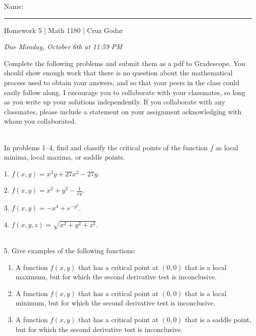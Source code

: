 \documentclass{article}
\begin{document}
\Large Name: \rule{2in}{0.15mm} \hfill Homework 5 | Math 1180 | Cruz Godar \vspace{4pt} \normalsize

\textit{Due Monday, October 6th at 11:59 PM}

Complete the following problems and submit them as a pdf to Gradescope. You should show enough work that there is no question about the mathematical process used to obtain your answers, and so that your peers in the class could easily follow along. I encourage you to collaborate with your classmates, so long as you write up your solutions independently. If you collaborate with any classmates, please include a statement on your assignment acknowledging with whom you collaborated.

~\\

In problems 1--4, find and classify the critical points of the function $f$ as local minima, local maxima, or saddle points.

1. $f(x, y) = x^3y + 27x^2 - 27y$.

2. $f(x, y) = x^2 + y^2 - \frac{1}{xy}$.

3. $f(x, y) = -x^4 + e^{-y^{2}}$.

4. $f(x, y, z) = \sqrt{x^2 + y^2 + z^2}$.

~\\

5. Give examples of the following functions:

\begin{enumerate}

	\item A function $f(x, y)$ that has a critical point at $(0, 0)$ that is a local maximum, but for which the second derivative test is inconclusive.

	\item A function $f(x, y)$ that has a critical point at $(0, 0)$ that is a local minimum, but for which the second derivative test is inconclusive.

	\item A function $f(x, y)$ that has a critical point at $(0, 0)$ that is a saddle point, but for which the second derivative test is inconclusive.

\end{enumerate}
\end{document}
